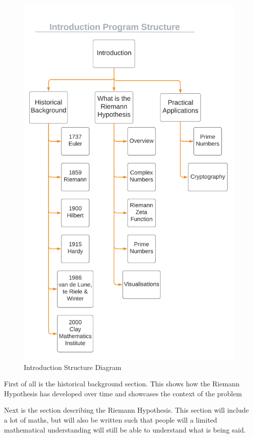 \documentclass[12pt]{article}
\begin{document}
\begin{figure}[h]
    \centering
    \captionsetup{justification=centering}
    \includegraphics[scale=0.385]{introduction-structure-diagram}
    \caption{Introduction Structure Diagram}
\end{figure}

First of all is the historical background section. This shows how the Riemann Hypothesis has developed over time and showcases the context of the problem

Next is the section describing the Riemann Hypothesis. This section will include a lot of maths, but will also be written such that people will a limited mathematical understanding will still be able to understand what is being said.
\end{document}
